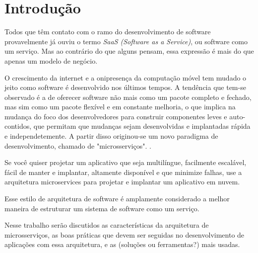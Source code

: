 \chapter{Introdução}\label{chapter-introducao}

Todos que têm contato com o ramo do desenvolvimento de software provavelmente já ouviu o termo \emph{SaaS (Software as a Service)}, ou software como um serviço. Mas ao contrário do que alguns pensam, essa expressão é mais do que apenas um modelo de negócio.

O crescimento da internet e a onipresença da computação móvel tem mudado o jeito como software é desenvolvido nos últimos tempos. A tendência que tem-se observado é a de oferecer software não mais como um pacote completo e fechado, mas sim como um pacote flexível e em constante melhoria, o que implica na mudança do foco dos desenvolvedores para construir componentes leves e auto-contidos, que permitam que mudanças sejam desenvolvidas e implantadas rápida e independetemente. A partir disso originou-se um novo paradigma de desenvolvimento, chamado de "microsserviços". \cite{middleware-microservices}.

\begin{citacao}
    Se você quiser projetar um aplicativo que seja multilíngue, facilmente escalável, fácil de manter e implantar, altamente disponível e que minimize falhas, use a arquitetura microservices para projetar e implantar um aplicativo em nuvem. \cite{oracle_microservices}
\end{citacao}

Esse estilo de arquitetura de software é amplamente considerado a melhor maneira de estruturar um sistema de software como um serviço. \cite{CAOPLE}

Nesse trabalho serão discutidos as características da arquitetura de microsserviços, as boas práticas que devem ser seguidas no desenvolvimento de aplicações com essa arquitetura, e as (soluções ou ferramentas?) mais usadas.



